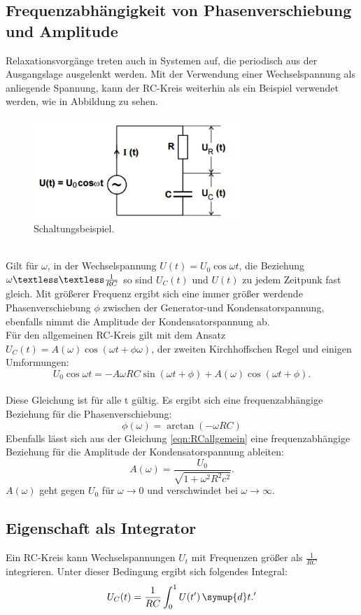 \subsection{Frequenzabhängigkeit von Phasenverschiebung und Amplitude}
Relaxationsvorgänge treten auch in Systemen auf, die periodisch aus der Ausgangslage ausgelenkt werden.
Mit der Verwendung einer Wechselspannung als anliegende Spannung, kann der RC-Kreis weiterhin als ein Beispiel verwendet werden, wie in Abbildung zu sehen.\\ %
\begin{figure}
  \centering
  \includegraphics[width=0.7\textwidth]{schaltbild2.PNG}
  \caption{Schaltungsbeispiel.\cite{skript}}
  \label{fig:schaltung2}
\end{figure}\\
Gilt für $\omega$, in der Wechselspannung $U(t)=U_0\cos\omega t$, die Beziehung $\omega\textless\textless\frac{1}{RC}$
so sind $U_C(t)$ und $U(t)$ zu jedem Zeitpunk fast gleich.
Mit größerer Frequenz ergibt sich eine immer größer werdende Phasenverschiebung $\phi$ zwischen der Generator-und Kondensatorspannung,
ebenfalls nimmt die Amplitude der Kondensatorspannung ab.\\
Für den allgemeinen RC-Kreis gilt mit dem Ansatz $U_C(t)=A(\omega)\cos(\omega t+\phi{\omega})$,
der zweiten Kirchhoffschen Regel und einigen Umformungen:
\begin{equation}
  U_0\cos\omega t =-A\omega RC\sin(\omega t+\phi)+A(\omega)\cos(\omega t+\phi).\label{eqn:RCallgemein}
\end{equation}\\
Diese Gleichung ist für alle t gültig.
Es ergibt sich eine frequenzabhängige Beziehung für die Phasenverschiebung:
\begin{equation}
  \phi(\omega)=\arctan(-\omega RC)
\end{equation}
Ebenfalls lässt sich aus der Gleichung \eqref{eqn:RCallgemein} eine frequenzabhängige Beziehung für die Amplitude der Kondensatorspannung ableiten:
\begin{equation}
  A(\omega)=\frac{U_0}{\sqrt{1+\omega^{2}R^2c^2}}.\label{eqn:amplitude}
\end{equation}
$A(\omega)$ geht gegen $U_0$ für $\omega\longrightarrow 0$ und verschwindet bei $\omega\longrightarrow\infty$.
\subsection{Eigenschaft als Integrator}
Ein RC-Kreis kann Wechselspannungen $U_t$ mit Frequenzen größer als $\frac{1}{RC}$ integrieren.
Unter dieser Bedingung ergibt sich folgendes Integral:
\begin{equation}
  U_C(t)=\frac{1}{RC}\int_{0}^{1} U(t') \, \symup{d}t.'\label{eqn:integration}
\end{equation}
